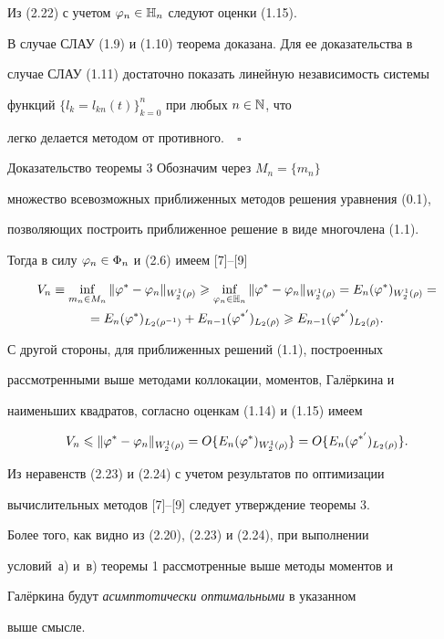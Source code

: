 Из (2.22) с учетом $\varphi_n\in \Bbb H_n$ следуют оценки (1.15).





В случае СЛАУ (1.9) и (1.10) теорема доказана. Для ее доказательства в 


случае СЛАУ (1.11) достаточно показать линейную независимость системы 


функций $\{l_k = l_{kn}(t)\}_{k=0}^n$ при любых $n \in \Bbb N$, что 


легко делается методом от противного.$\quad\square$





\begin{pf*}{Доказательство теоремы 3} Обозначим через $M_n = \{m_n\}$ 


множество всевозможных приближенных методов решения уравнения (0.1), 


позволяющих построить приближенное решение в виде многочлена (1.1). 


Тогда в силу $\varphi_n\in \Phi_n$ и (2.6) имеем [7]--[9]


\begin{multline}


V_n\equiv \inf\limits_{m_n\in M_n}\|\vp^* - \vp_n\|_{W_2^1(\rho)}


\gea \inf\limits_{\vp_n\in \H_n}\|\vp^*-\vp_n\|_{W_2^1(\rho)}=


E_n(\vp^*)_{W_2^1(\rho)} = \\


%


=E_n(\vp^*)_{L_2(\rho^{-1})} + E_{n-1}(\vp^{*'})_{L_2(\rho)}


\gea E_{n-1}(\vp^{*'})_{L_2(\rho)}.


\end{multline}


С другой стороны, для приближенных решений (1.1), построенных 


рассмотренными выше методами коллокации, моментов, Гал\"еркина и 


наименьших квадратов, согласно оценкам (1.14) и (1.15) имеем


\begin{equation}


V_n\lea \|\vp^* - \vp_n\|_{W_2^1(\rho)} = O\{E_n(\vp^*)_{W_2^1(\rho)}\}


= O\{E_n(\vp^{*'})_{L_2(\rho)}\}.


\end{equation}


Из неравенств (2.23) и (2.24) с учетом результатов по оптимизации 


вычислительных методов [7]--[9] следует утверждение теоремы 3. 


Более того, как видно из (2.20), (2.23) и (2.24), при выполнении 


условий~а) и~в) теоремы 1 рассмотренные выше методы моментов и 


Гал\"еркина будут {\it асимптотически оптимальными} в указанном 


выше смысле.


\end{pf*}
